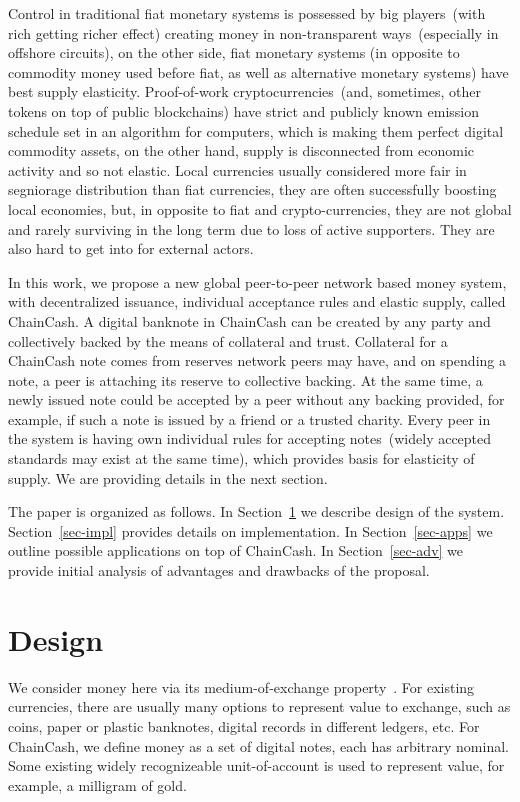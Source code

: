 \documentclass{llncs}   %
\newcommand{\cc}{ChainCash}
\begin{document}
Control in traditional fiat monetary systems is possessed by big players~(with rich getting richer effect) creating
money in non-transparent ways~(especially in offshore circuits), on the other side,
fiat monetary systems (in opposite to commodity money used before fiat, as well as alternative monetary systems) have
best supply elasticity. Proof-of-work cryptocurrencies~(and, sometimes, other tokens on top of public blockchains) have strict and
publicly known emission schedule set in an algorithm for computers, which is making them perfect digital commodity assets,
on the other hand, supply is disconnected from economic activity and so not elastic. Local currencies usually considered
more fair in segniorage distribution than fiat currencies, they are often successfully boosting local economies, but,
in opposite to fiat and crypto-currencies, they are not global and rarely surviving in the long term due to loss of active supporters.
They are also hard to get into for external actors.

In this work, we propose a new global peer-to-peer network based money system, with decentralized issuance, individual acceptance rules and elastic supply, called \cc{}.
A digital banknote in \cc{} can be created by any party and collectively backed by the means of collateral and trust. Collateral for a \cc{} note comes from reserves network peers may have, and on spending a note, a peer is attaching its
reserve to collective backing. At the same time, a newly issued note could be accepted by a peer without any backing provided, for example, if such a note is issued by a friend or a trusted charity. Every peer in the system is having own individual rules
for accepting notes~(widely accepted standards may exist at the same time), which provides basis for elasticity of supply. We are providing details in the next section.

The paper is organized as follows. In Section~\ref{sec-design} we describe design of the system. Section~\ref{sec-impl} provides
details on implementation. In Section~\ref{sec-apps} we outline possible applications on top of \cc{}. In Section~\ref{sec-adv} we provide initial analysis
of advantages and drawbacks of the proposal.

\section{Design}
\label{sec-design}

We consider money here via its medium-of-exchange property~\cite{kiyotaki1989money}. For existing currencies, there are usually many options to represent value to exchange, such as coins, paper or plastic banknotes, digital records in different ledgers, etc. For \cc{}, we define money as a set of digital notes, each has arbitrary nominal. Some existing widely recognizeable unit-of-account is used to represent value, for example, a milligram of gold.
\end{document}
